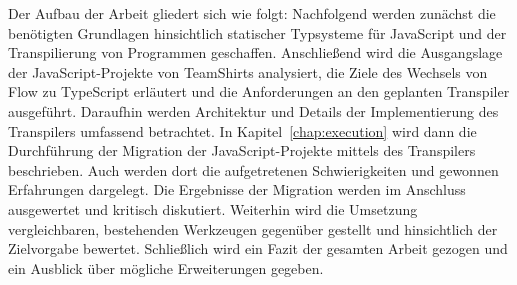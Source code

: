 Der Aufbau der Arbeit gliedert sich wie folgt: Nachfolgend werden zunächst die benötigten Grundlagen hinsichtlich statischer Typsysteme für JavaScript und der Transpilierung von Programmen geschaffen. Anschließend wird die Ausgangslage der JavaScript-Projekte von TeamShirts analysiert, die Ziele des Wechsels von Flow zu TypeScript erläutert und die Anforderungen an den geplanten Transpiler ausgeführt. Daraufhin werden Architektur und Details der Implementierung des Transpilers umfassend betrachtet. In Kapitel~\ref{chap:execution} wird dann die Durchführung der Migration der JavaScript-Projekte mittels des Transpilers beschrieben. Auch werden dort die aufgetretenen Schwierigkeiten und gewonnen Erfahrungen dargelegt. Die Ergebnisse der Migration werden im Anschluss ausgewertet und kritisch diskutiert. Weiterhin wird die Umsetzung vergleichbaren, bestehenden Werkzeugen gegenüber gestellt und hinsichtlich der Zielvorgabe bewertet. Schließlich wird ein Fazit der gesamten Arbeit gezogen und ein Ausblick über mögliche Erweiterungen gegeben.

